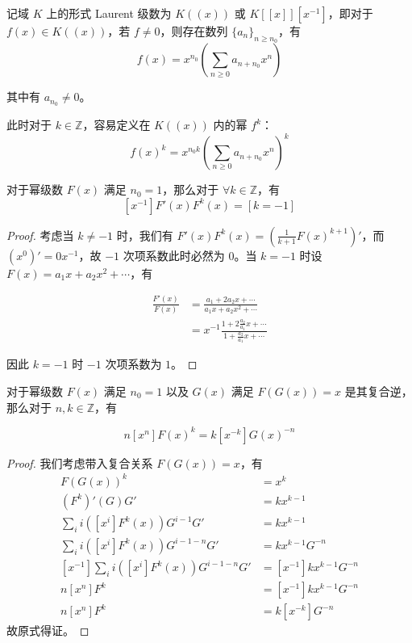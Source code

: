\begin{definition}[形式 Laurent 级数]
记域 $K$ 上的形式 Laurent 级数为 $K((x))$ 或 $K[[x]][x^{-1}]$，即对于 $f(x) \in K((x))$，若 $f\neq 0$，则存在数列 $\{a_n\}_{n\ge n_0}$，有
$$
f(x) = x^{n_0} \left(\sum_{n\ge 0} a_{n+n_0} x^n\right)
$$

其中有 $a_{n_0} \neq 0$。

此时对于 $k\in \mathbb Z$，容易定义在 $K((x))$ 内的幂 $f^k$：
$$
f(x)^k = x^{n_0 k} \left(\sum_{n\ge 0} a_{n+n_0} x^n\right)^k
$$
\end{definition}

\begin{lemma}[形式留数]
对于幂级数 $F(x)$ 满足 $n_0 = 1$，那么对于 $\forall k\in \mathbb Z$，有
$$
[x^{-1}]F'(x)F^k(x)=[k=-1]
$$
\end{lemma}

\begin{proof} 考虑当 $k\neq -1$ 时，我们有 $F'(x)F^k(x)=(\frac 1{k+1} F(x)^{k+1})'$，而 $(x^0)'=0x^{-1}$，故 $-1$ 次项系数此时必然为 $0$。当 $k=-1$ 时设 $F(x) = a_1 x + a_2 x^2 + \cdots$，有

\begin{align*}
\frac{F'(x)}{F(x)} &= \frac{a_1 + 2a_2x + \cdots}{a_1 x + a_2 x^2 + \cdots}\\
&= x^{-1} \frac{1 + 2\frac{a_2}{a_1} x + \cdots}{1 + \frac{a_2}{a_1} x + \cdots}
\end{align*}

因此 $k=-1$ 时 $-1$ 次项系数为 $1$。
\end{proof}
\begin{theorem}[Lagrange 反演]
对于幂级数 $F(x)$ 满足 $n_0 = 1$ 以及 $G(x)$ 满足 $F(G(x))=x$ 是其复合逆，那么对于 $n,k\in \mathbb Z$，有

$$
n[x^n]F(x)^k = k[x^{-k}]G(x)^{-n}
$$
\end{theorem}

\begin{proof}
我们考虑带入复合关系 $F(G(x))=x$，有
\begin{align*}
F(G(x))^k &= x^k\\
(F^k)'(G)G' &= kx^{k-1}\\
\sum_{i} i([x^i] F^k(x)) G^{i-1}G' &= kx^{k-1}\\
\sum_{i} i([x^i] F^k(x)) G^{i-1-n}G' &= kx^{k-1}G^{-n}\\ 
[x^{-1}]\sum_{i} i([x^i] F^k(x)) G^{i-1-n}G' &= [x^{-1}]kx^{k-1}G^{-n}\\ 
n[x^n] F^k &= [x^{-1}]kx^{k-1}G^{-n}\\ 
n[x^n] F^k &= k[x^{-k}]G^{-n}
\end{align*}
故原式得证。
\end{proof}

